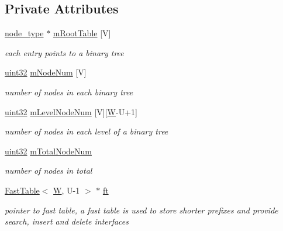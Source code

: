 \subsection*{Private Attributes}
\begin{DoxyCompactItemize}
\item 
\hyperlink{classRBTree_a34cd65cfffec3d99e0a73deafa471078}{node\-\_\-type} $\ast$ \hyperlink{classRBTree_afa0e7bbf323151a0d0047a31452c09e2}{m\-Root\-Table} \mbox{[}V\mbox{]}
\begin{DoxyCompactList}\small\item\em each entry points to a binary tree \end{DoxyCompactList}\item 
\hyperlink{types_8h_abd01e8e67e3d94cab04ecaaf4f85ac1b}{uint32} \hyperlink{classRBTree_a0b1d29091a098e2ba8d1f89df1e9b1cc}{m\-Node\-Num} \mbox{[}V\mbox{]}
\begin{DoxyCompactList}\small\item\em number of nodes in each binary tree \end{DoxyCompactList}\item 
\hyperlink{types_8h_abd01e8e67e3d94cab04ecaaf4f85ac1b}{uint32} \hyperlink{classRBTree_aeaf334c4db430ec17c09d13845888a7f}{m\-Level\-Node\-Num} \mbox{[}V\mbox{]}\mbox{[}\hyperlink{test__u128_8cpp_ab21b528bc38899d04d3a7053e52fb797}{W}-\/U+1\mbox{]}
\begin{DoxyCompactList}\small\item\em number of nodes in each level of a binary tree \end{DoxyCompactList}\item 
\hyperlink{types_8h_abd01e8e67e3d94cab04ecaaf4f85ac1b}{uint32} \hyperlink{classRBTree_aa14705d97172b233354c4308df69f8f6}{m\-Total\-Node\-Num}
\begin{DoxyCompactList}\small\item\em number of nodes in total \end{DoxyCompactList}\item 
\hyperlink{structFastTable}{Fast\-Table}$<$ \hyperlink{test__u128_8cpp_ab21b528bc38899d04d3a7053e52fb797}{W}, U-\/1 $>$ $\ast$ \hyperlink{classRBTree_a054f43074586a88ce2632cbaca07fa0b}{ft}
\begin{DoxyCompactList}\small\item\em pointer to fast table, a fast table is used to store shorter prefixes and provide search, insert and delete interfaces \end{DoxyCompactList}\end{DoxyCompactItemize}


